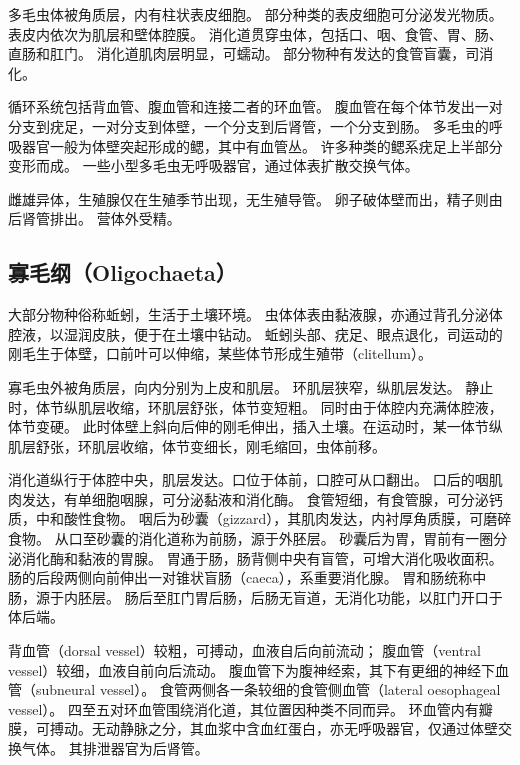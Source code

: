 \documentclass[11pt]{article}
\begin{document}
多毛虫体被角质层，内有柱状表皮细胞。
部分种类的表皮细胞可分泌发光物质。
表皮内依次为肌层和壁体腔膜。
消化道贯穿虫体，包括口、咽、食管、胃、肠、直肠和肛门。
消化道肌肉层明显，可蠕动。
部分物种有发达的食管盲囊，司消化。

\newline

循环系统包括背血管、腹血管和连接二者的环血管。
腹血管在每个体节发出一对分支到疣足，一对分支到体壁，一个分支到后肾管，一个分支到肠。
多毛虫的呼吸器官一般为体壁突起形成的鳃，其中有血管丛。
许多种类的鳃系疣足上半部分变形而成。
一些小型多毛虫无呼吸器官，通过体表扩散交换气体。

\newline

雌雄异体，生殖腺仅在生殖季节出现，无生殖导管。
卵子破体壁而出，精子则由后肾管排出。
营体外受精。
  
\subsection{寡毛纲（Oligochaeta）}
大部分物种俗称蚯蚓，生活于土壤环境。
虫体体表由黏液腺，亦通过背孔分泌体腔液，以湿润皮肤，便于在土壤中钻动。
蚯蚓头部、疣足、眼点退化，司运动的刚毛生于体壁，口前叶可以伸缩，某些体节形成生殖带（clitellum）。

\newline

寡毛虫外被角质层，向内分别为上皮和肌层。
环肌层狭窄，纵肌层发达。
静止时，体节纵肌层收缩，环肌层舒张，体节变短粗。
同时由于体腔内充满体腔液，体节变硬。
此时体壁上斜向后伸的刚毛伸出，插入土壤。在运动时，某一体节纵肌层舒张，环肌层收缩，体节变细长，刚毛缩回，虫体前移。

\newline

消化道纵行于体腔中央，肌层发达。口位于体前，口腔可从口翻出。
口后的咽肌肉发达，有单细胞咽腺，可分泌黏液和消化酶。
食管短细，有食管腺，可分泌钙质，中和酸性食物。
咽后为砂囊（gizzard），其肌肉发达，内衬厚角质膜，可磨碎食物。
从口至砂囊的消化道称为前肠，源于外胚层。
砂囊后为胃，胃前有一圈分泌消化酶和黏液的胃腺。
胃通于肠，肠背侧中央有盲管，可增大消化吸收面积。
肠的后段两侧向前伸出一对锥状盲肠（caeca），系重要消化腺。
胃和肠统称中肠，源于内胚层。
肠后至肛门胃后肠，后肠无盲道，无消化功能，以肛门开口于体后端。

\newline

背血管（dorsal vessel）较粗，可搏动，血液自后向前流动；
腹血管（ventral vessel）较细，血液自前向后流动。
腹血管下为腹神经索，其下有更细的神经下血管（subneural vessel）。
食管两侧各一条较细的食管侧血管（lateral oesophageal vessel）。
四至五对环血管围绕消化道，其位置因种类不同而异。
环血管内有瓣膜，可搏动。无动静脉之分，其血浆中含血红蛋白，亦无呼吸器官，仅通过体壁交换气体。
其排泄器官为后肾管。
\end{document}
